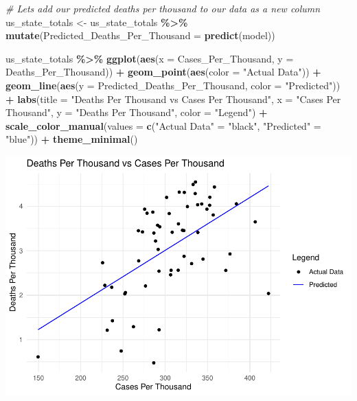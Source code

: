 \documentclass[
]{article}
\newenvironment{Shaded}{\begin{snugshade}}{\end{snugshade}}
\newcommand{\AttributeTok}[1]{\textcolor[rgb]{0.13,0.29,0.53}{#1}}
\newcommand{\CommentTok}[1]{\textcolor[rgb]{0.56,0.35,0.01}{\textit{#1}}}
\newcommand{\FunctionTok}[1]{\textcolor[rgb]{0.13,0.29,0.53}{\textbf{#1}}}
\newcommand{\NormalTok}[1]{#1}
\newcommand{\OtherTok}[1]{\textcolor[rgb]{0.56,0.35,0.01}{#1}}
\newcommand{\SpecialCharTok}[1]{\textcolor[rgb]{0.81,0.36,0.00}{\textbf{#1}}}
\newcommand{\StringTok}[1]{\textcolor[rgb]{0.31,0.60,0.02}{#1}}
\begin{document}
\begin{Shaded}
\begin{Highlighting}[]
\CommentTok{\# Lets add our predicted deaths per thousand to our data as a new column}
\NormalTok{us\_state\_totals }\OtherTok{\textless{}{-}}\NormalTok{ us\_state\_totals }\SpecialCharTok{\%\textgreater{}\%}
  \FunctionTok{mutate}\NormalTok{(}\AttributeTok{Predicted\_Deaths\_Per\_Thousand =} \FunctionTok{predict}\NormalTok{(model))}

\NormalTok{us\_state\_totals }\SpecialCharTok{\%\textgreater{}\%}
  \FunctionTok{ggplot}\NormalTok{(}\FunctionTok{aes}\NormalTok{(}\AttributeTok{x =}\NormalTok{ Cases\_Per\_Thousand, }\AttributeTok{y =}\NormalTok{ Deaths\_Per\_Thousand)) }\SpecialCharTok{+}
  \FunctionTok{geom\_point}\NormalTok{(}\FunctionTok{aes}\NormalTok{(}\AttributeTok{color =} \StringTok{"Actual Data"}\NormalTok{)) }\SpecialCharTok{+}
  \FunctionTok{geom\_line}\NormalTok{(}\FunctionTok{aes}\NormalTok{(}\AttributeTok{y =}\NormalTok{ Predicted\_Deaths\_Per\_Thousand, }\AttributeTok{color =} \StringTok{"Predicted"}\NormalTok{)) }\SpecialCharTok{+}
  \FunctionTok{labs}\NormalTok{(}\AttributeTok{title =} \StringTok{"Deaths Per Thousand vs Cases Per Thousand"}\NormalTok{,}
       \AttributeTok{x =} \StringTok{"Cases Per Thousand"}\NormalTok{,}
       \AttributeTok{y =} \StringTok{"Deaths Per Thousand"}\NormalTok{,}
       \AttributeTok{color =} \StringTok{"Legend"}\NormalTok{) }\SpecialCharTok{+}
  \FunctionTok{scale\_color\_manual}\NormalTok{(}\AttributeTok{values =} \FunctionTok{c}\NormalTok{(}\StringTok{"Actual Data"} \OtherTok{=} \StringTok{"black"}\NormalTok{, }\StringTok{"Predicted"} \OtherTok{=} \StringTok{"blue"}\NormalTok{)) }\SpecialCharTok{+}
  \FunctionTok{theme\_minimal}\NormalTok{()}
\end{Highlighting}
\end{Shaded}

\includegraphics{covid-data-analysis_files/figure-latex/model-1.pdf}
\end{document}
